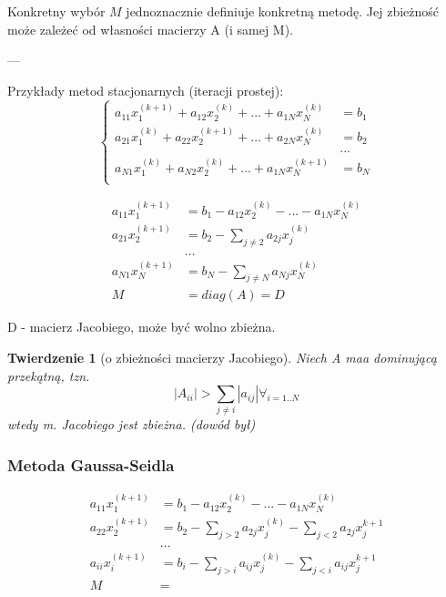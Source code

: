 \documentclass[hidelinks,a4paper,fleqn]{article}
\newtheorem{twierdz}{Twierdzenie}
\begin{document}
Konkretny wybór $M$ jednoznacznie definiuje konkretną metodę. Jej zbieżność może zależeć od własności macierzy A (i samej M).

---

Przykłady metod stacjonarnych (iteracji prostej):
\[
	\left\{ \begin{array}{ll}
	a_{11}x_1^{(k+1)} + a_{12}x_2^{(k)} + ... + a_{1N}x_N^{(k)} & = b_1 \\
	a_{21}x_1^{(k)} + a_{22}x_2^{(k+1)} + ... + a_{2N}x_N^{(k)} & = b_2 \\
	& ... \\
	a_{N1}x_1^{(k)} + a_{N2}x_2^{(k)} + ... + a_{1N}x_N^{(k+1)} & = b_N \\
	\end{array} \right.
\]

\[
	\begin{array}{ll}
		a_{11}x_1^{(k+1)} & = b_1 - a_{12}x_2^{(k)} - ... - a_{1N}x_N^{(k)} \\
		a_{21}x_2^{(k+1)} & = b_2 - \sum_{j\neq 2} a_{2j}x_j^{(k)}          \\
		                  & ...                                             \\
		a_{N1}x_N^{(k+1)} & = b_N - \sum_{j\neq N} a_{Nj}x_N^{(k)}          \\
		M                 & = diag(A) = D                                   
	\end{array}
\]

D - macierz Jacobiego, może być wolno zbieżna.

\begin{twierdz}[o zbieżności macierzy Jacobiego] Niech A maa dominującą przekątną, tzn.
	\[
		|A_{ii}| > \sum_{j \neq i}|a_{ij}| \forall_{i=1..N}
	\]
	wtedy m. Jacobiego jest zbieżna. (dowód był)	
\end{twierdz}
 

\subsubsection{Metoda Gaussa-Seidla} 
\[
	\begin{array}{ll}
		a_{11}x_1^{(k+1)} & = b_1 - a_{12}x_2^{(k)} - ... - a_{1N}x_N^{(k)}                     \\
		a_{22}x_2^{(k+1)} & = b_2 - \sum_{j > 2} a_{2j}x_j^{(k)} - \sum_{j < 2} a_{2j}x_j^{k+1} \\
		                  & ...                                                                 \\
		a_{ii}x_i^{(k+1)} & = b_i - \sum_{j > i} a_{ij}x_j^{(k)} - \sum_{j < i} a_{ij}x_j^{k+1} \\
		M                 & =                                                                   
	\end{array}
\]
 
\end{document}
